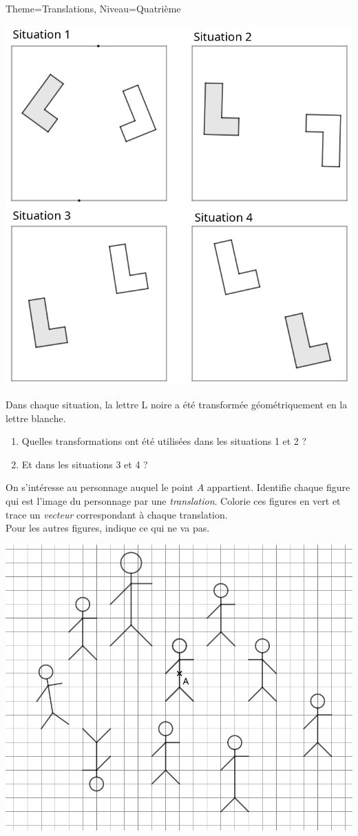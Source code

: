 \documentclass[11pt]{article}
\begin{document}
\begin{Maquette}[Fiche]{Theme=Translations, Niveau=Quatrième}

\begin{exercice}
    \begin{center}
    \includegraphics[width=.75\linewidth]{Images/exercice1.png}
    \end{center}
    Dans chaque situation, la lettre L noire a été transformée géométriquement en la lettre blanche.
    \begin{enumerate}
        \item Quelles transformations ont été utilisées dans les situations 1 et 2 ?
        \item Et dans les situations 3 et 4 ?
    \end{enumerate}
\end{exercice}

\newpage

\begin{exercice}
    On s’intéresse au personnage auquel le point $A$ appartient. Identifie chaque figure qui est l’image du personnage par une \emph{translation}. Colorie ces figures en vert et trace un \emph{vecteur} correspondant à chaque translation.\\
    Pour les autres figures, indique ce qui ne va pas.
    \begin{center}
        \includegraphics[width=.75\linewidth]{Images/exercice2.png}
    \end{center}
\end{exercice}


\end{Maquette}
\end{document}
